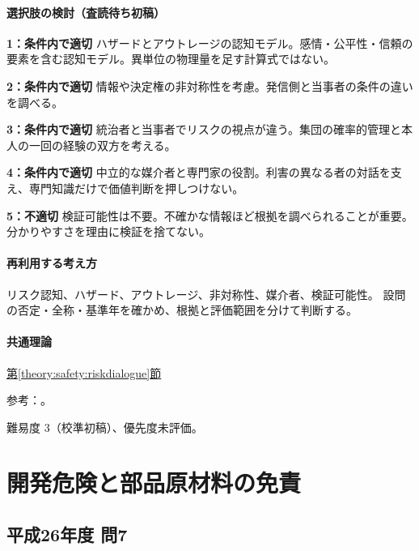 \paragraph{選択肢の検討（査読待ち初稿）}\mbox{}\par

\noindent\textbf{1：条件内で適切} ハザードとアウトレージの認知モデル。感情・公平性・信頼の要素を含む認知モデル。異単位の物理量を足す計算式ではない。\par

\noindent\textbf{2：条件内で適切} 情報や決定権の非対称性を考慮。発信側と当事者の条件の違いを調べる。\par

\noindent\textbf{3：条件内で適切} 統治者と当事者でリスクの視点が違う。集団の確率的管理と本人の一回の経験の双方を考える。\par

\noindent\textbf{4：条件内で適切} 中立的な媒介者と専門家の役割。利害の異なる者の対話を支え、専門知識だけで価値判断を押しつけない。\par

\noindent\textbf{5：不適切} 検証可能性は不要。不確かな情報ほど根拠を調べられることが重要。分かりやすさを理由に検証を捨てない。\par

\paragraph{再利用する考え方} リスク認知、ハザード、アウトレージ、非対称性、媒介者、検証可能性。 設問の否定・全称・基準年を確かめ、根拠と評価範囲を分けて判断する。

\paragraph{共通理論} \hyperref[theory:safety:riskdialogue]{第\ref*{theory:safety:riskdialogue}節}

\par 参考：\cite{eth54_riskcomm}。

\par 難易度 3（校準初稿）、優先度未評価。

\section{開発危険と部品原材料の免責}

\subsection{平成26年度 問7}
\label{q:h26-reg-apt-07}

